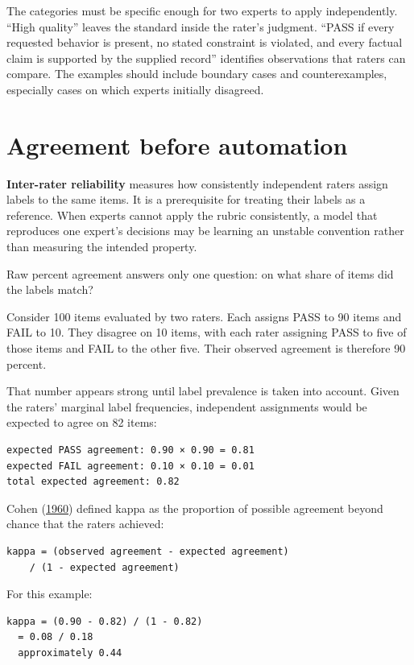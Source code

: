 The categories must be specific enough for two experts to apply independently. ``High quality'' leaves the standard inside the rater's judgment. ``PASS if every requested behavior is present, no stated constraint is violated, and every factual claim is supported by the supplied record'' identifies observations that raters can compare. The examples should include boundary cases and counterexamples, especially cases on which experts initially disagreed.

\section{Agreement before automation}\label{agreement-before-automation}

\textbf{Inter-rater reliability} measures how consistently independent raters assign labels to the same items. It is a prerequisite for treating their labels as a reference. When experts cannot apply the rubric consistently, a model that reproduces one expert's decisions may be learning an unstable convention rather than measuring the intended property.

Raw percent agreement answers only one question: on what share of items did the labels match?

Consider 100 items evaluated by two raters. Each assigns PASS to 90 items and FAIL to 10. They disagree on 10 items, with each rater assigning PASS to five of those items and FAIL to the other five. Their observed agreement is therefore 90 percent.

That number appears strong until label prevalence is taken into account. Given the raters' marginal label frequencies, independent assignments would be expected to agree on 82 items:

\begin{verbatim}
expected PASS agreement: 0.90 × 0.90 = 0.81
expected FAIL agreement: 0.10 × 0.10 = 0.01
total expected agreement: 0.82
\end{verbatim}

Cohen (\href{https://doi.org/10.1177/001316446002000104}{1960}) defined kappa as the proportion of possible agreement beyond chance that the raters achieved:

\begin{verbatim}
kappa = (observed agreement - expected agreement)
    / (1 - expected agreement)
\end{verbatim}

For this example:

\begin{verbatim}
kappa = (0.90 - 0.82) / (1 - 0.82)
  = 0.08 / 0.18
  approximately 0.44
\end{verbatim}

